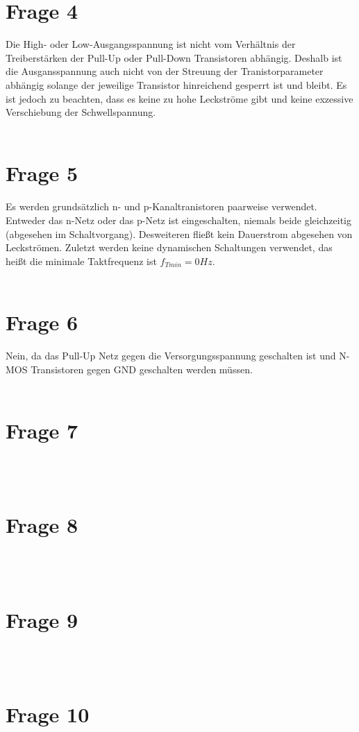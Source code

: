 \documentclass[a4paper]{scrartcl}
\begin{document}
\section*{Frage 4}
Die High- oder Low-Ausgangsspannung ist nicht vom Verhältnis der Treiberstärken der Pull-Up oder Pull-Down Transistoren abhängig. Deshalb ist die Ausgansspannung auch nicht von der Streuung der Tranistorparameter abhängig solange der jeweilige Transistor hinreichend gesperrt ist und bleibt. Es ist jedoch zu beachten, dass es keine zu hohe Leckströme gibt und keine exzessive Verschiebung der Schwellspannung.
~\\
~\\
\section*{Frage 5}
Es werden grundsätzlich n- und p-Kanaltranistoren paarweise verwendet. Entweder das n-Netz oder das p-Netz ist eingeschalten, niemals beide gleichzeitig (abgesehen im Schaltvorgang). Desweiteren fließt kein Dauerstrom abgesehen von Leckströmen. Zuletzt werden keine dynamischen Schaltungen verwendet, das heißt die minimale Taktfrequenz ist $f_{Tmin} = 0 Hz$.
~\\
~\\
\section*{Frage 6}
Nein, da das Pull-Up Netz gegen die Versorgungsspannung geschalten ist und N-MOS Transistoren gegen GND geschalten werden müssen.
~\\
~\\
\section*{Frage 7}

~\\
~\\
\section*{Frage 8}

~\\
~\\
\section*{Frage 9}

~\\
~\\
\section*{Frage 10}

~\\
~\\
\end{document}
